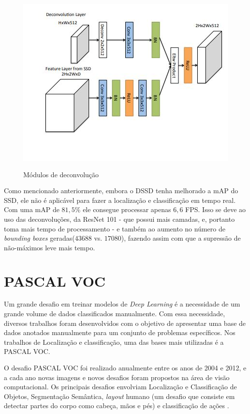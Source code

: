 \begin{figure}[H]
	\setlength{\abovecaptionskip}{0pt}
	\setlength{\belowcaptionskip}{0pt}
	\caption[Módulos de deconvolução]{Módulos de deconvolução}
	\centering
	\includegraphics[width=.6\textwidth]{imagem/0x_dssd-deconv.jpg}
	\captionsetup{justification=centering}
	\label{fig:deconv}
\end{figure}

Como mencionado anteriormente, embora o \ac{DSSD} tenha melhorado a \ac{mAP} do \ac{SSD}, ele não é aplicável para fazer a localização e classificação em tempo real. Com uma \ac{mAP} de $81,5\%$ ele consegue processar apenas $6,6$ \ac{FPS}. Isso se deve ao uso das deconvoluções, da ResNet 101 - que possui mais camadas, e, portanto toma mais tempo de processamento - e também ao aumento no número de \textit{bounding boxes} geradas($43688$ vs. $17080$), fazendo assim com que a supressão de não-máximos leve mais tempo.

\section{PASCAL VOC}
\label{secao:3:4}

Um grande desafio em treinar modelos de \textit{Deep Learning} é a necessidade de um grande volume de dados classificados manualmente. Com essa necessidade, diversos trabalhos foram desenvolvidos com o objetivo de apresentar uma base de dados anotados manualmente para um conjunto de problemas específicos. Nos trabalhos de Localização e classificação, uma das bases mais utilizadas é a \ac{PASCAL VOC}.

O desafio \ac{PASCAL VOC} foi realizado anualmente entre os anos de 2004 e 2012, e a cada ano novas imagens e novos desafios foram propostos na área de visão computacional. Os principais desafios envolviam Localização e Classificação de Objetos, Segmentação Semântica, \textit{layout} humano (um desafio que consiste em detectar partes do corpo como cabeça, mãos e pés) e classificação de ações \cite{everingham-2015}.

